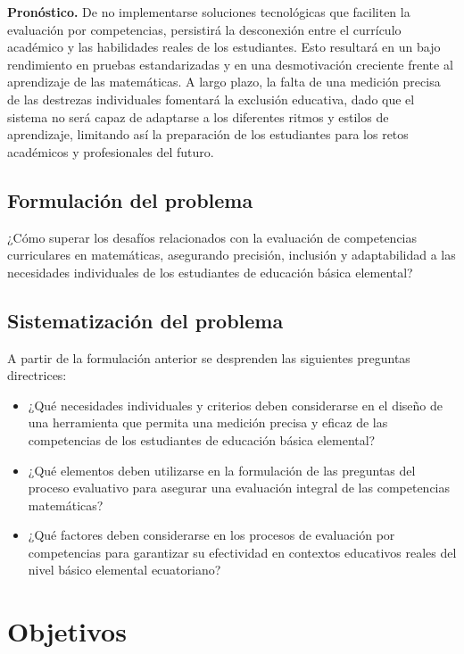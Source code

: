 \textbf{Pronóstico.} De no implementarse soluciones tecnológicas que faciliten la evaluación por competencias, persistirá la desconexión entre el currículo académico y las habilidades reales de los estudiantes. Esto resultará en un bajo rendimiento en pruebas estandarizadas y en una desmotivación creciente frente al aprendizaje de las matemáticas. A largo plazo, la falta de una medición precisa de las destrezas individuales fomentará la exclusión educativa, dado que el sistema no será capaz de adaptarse a los diferentes ritmos y estilos de aprendizaje, limitando así la preparación de los estudiantes para los retos académicos y profesionales del futuro.

\subsection{Formulación del problema}

¿Cómo superar los desafíos relacionados con la evaluación de competencias curriculares en matemáticas, asegurando precisión, inclusión y adaptabilidad a las necesidades individuales de los estudiantes de educación básica elemental?

\subsection{Sistematización del problema}

A partir de la formulación anterior se desprenden las siguientes preguntas directrices:

\begin{itemize}[leftmargin=*]
\item ¿Qué necesidades individuales y criterios deben considerarse en el diseño de una herramienta que permita una medición precisa y eficaz de las competencias de los estudiantes de educación básica elemental?
\item ¿Qué elementos deben utilizarse en la formulación de las preguntas del proceso evaluativo para asegurar una evaluación integral de las competencias matemáticas?
\item ¿Qué factores deben considerarse en los procesos de evaluación por competencias para garantizar su efectividad en contextos educativos reales del nivel básico elemental ecuatoriano?
\end{itemize}

\section{Objetivos}

